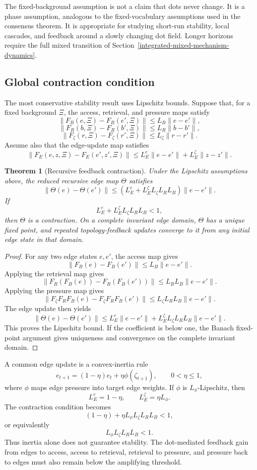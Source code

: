 \documentclass[11pt]{article}
\newtheorem{theorem}{Theorem}
\theoremstyle{remark}
\begin{document}
The fixed-background assumption is not a claim that dots never change. It is a phase assumption, analogous to the fixed-vocabulary assumptions used in the consensus theorem. It is appropriate for studying short-run stability, local cascades, and feedback around a slowly changing dot field. Longer horizons require the full mixed transition of Section~\ref{integrated-mixed-mechanism-dynamics}.

\subsection{Global contraction condition}\label{global-contraction-condition}

The most conservative stability result uses Lipschitz bounds. Suppose that, for a fixed background \(\Xi\), the access, retrieval, and pressure maps satisfy
\[
\|F_B(e,\Xi)-F_B(e',\Xi)\|\leq L_B\|e-e'\|,
\]
\[
\|F_R(b,\Xi)-F_R(b',\Xi)\|\leq L_R\|b-b'\|,
\]
\[
\|F_\zeta(r,\Xi)-F_\zeta(r',\Xi)\|\leq L_\zeta\|r-r'\|.
\]
Assume also that the edge-update map satisfies
\[
\|F_E(e,z,\Xi)-F_E(e',z',\Xi)\|\leq L_E^e\|e-e'\|+L_E^\zeta\|z-z'\|.
\]

\begin{theorem}[Recursive feedback contraction]\label{thm:recursive-feedback-contraction}
Under the Lipschitz assumptions above, the reduced recursive edge map \(\Theta\) satisfies
\[
\|\Theta(e)-\Theta(e')\|\leq
\left(L_E^e+L_E^\zeta L_\zeta L_R L_B\right)\|e-e'\|.
\]
If
\[
L_E^e+L_E^\zeta L_\zeta L_R L_B<1,
\]
then \(\Theta\) is a contraction. On a complete invariant edge domain, \(\Theta\) has a unique fixed point, and repeated topology-feedback updates converge to it from any initial edge state in that domain.
\end{theorem}

\begin{proof}
For any two edge states \(e,e'\), the access map gives
\[
\|F_B(e)-F_B(e')\|\leq L_B\|e-e'\|.
\]
Applying the retrieval map gives
\[
\|F_R(F_B(e))-F_R(F_B(e'))\|\leq L_R L_B\|e-e'\|.
\]
Applying the pressure map gives
\[
\|F_\zeta F_R F_B(e)-F_\zeta F_R F_B(e')\|\leq L_\zeta L_R L_B\|e-e'\|.
\]
The edge update then yields
\[
\|\Theta(e)-\Theta(e')\|
\leq L_E^e\|e-e'\|+L_E^\zeta L_\zeta L_R L_B\|e-e'\|.
\]
This proves the Lipschitz bound. If the coefficient is below one, the Banach fixed-point argument gives uniqueness and convergence on the complete invariant domain.
\end{proof}

A common edge update is a convex-inertia rule
\[
e_{t+1}=(1-\eta)e_t+\eta\phi(\zeta_{t+1}),\qquad 0<\eta\leq 1,
\]
where \(\phi\) maps edge pressure into target edge weights. If \(\phi\) is \(L_\phi\)-Lipschitz, then
\[
L_E^e=1-\eta,\qquad L_E^\zeta=\eta L_\phi.
\]
The contraction condition becomes
\[
(1-\eta)+\eta L_\phi L_\zeta L_R L_B<1,
\]
or equivalently
\[
L_\phi L_\zeta L_R L_B<1.
\]
Thus inertia alone does not guarantee stability. The dot-mediated feedback gain from edges to access, access to retrieval, retrieval to pressure, and pressure back to edges must also remain below the amplifying threshold.
\end{document}
